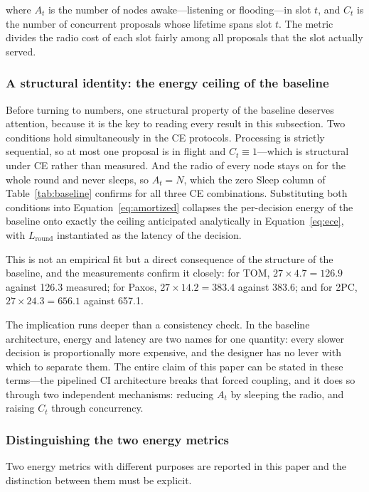 \documentclass[journal]{IEEEtran}
\newcommand{\CI}{CI}                      %
\newcommand{\CE}{CE}                      %
\newcommand{\Nnodes}{N}                   %
\newcommand{\Lround}{L_{\mathrm{round}}}  %
\begin{document}
where $A_t$ is the number of nodes awake---listening or flooding---in slot
$t$, and $C_t$ is the number of concurrent proposals whose lifetime spans
slot $t$. The metric divides the radio cost of each slot fairly among all
proposals that the slot actually served.

\subsubsection{A structural identity: the energy ceiling of the baseline}

Before turning to numbers, one structural property of the baseline
deserves attention, because it is the key to reading every result in this
subsection. Two conditions hold simultaneously in the \CE{} protocols.
Processing is strictly sequential, so at most one proposal is in flight
and $C_t \equiv 1$---which is structural under \CE{} rather than measured.
And the radio of every node stays on
for the whole round and never sleeps, so $A_t = \Nnodes$, which the zero
Sleep column of Table~\ref{tab:baseline} confirms for all three \CE{}
combinations. Substituting both conditions into
Equation~\eqref{eq:amortized} collapses the per-decision energy of the
baseline onto exactly the ceiling anticipated analytically in
Equation~\eqref{eq:ece}, with $\Lround$ instantiated as the latency of the
decision.

This is not an empirical fit but a direct consequence of the structure of
the baseline, and the measurements confirm it closely: for TOM,
$27 \times 4.7 = 126.9$ against 126.3 measured; for Paxos,
$27 \times 14.2 = 383.4$ against 383.6; and for 2PC,
$27 \times 24.3 = 656.1$ against 657.1.

The implication runs deeper than a consistency check. In the baseline
architecture, energy and latency are two names for one quantity: every
slower decision is proportionally more expensive, and the designer has no
lever with which to separate them. The entire claim of this paper can be
stated in these terms---the pipelined \CI{} architecture breaks that
forced coupling, and it does so through two independent mechanisms:
reducing $A_t$ by sleeping the radio, and raising $C_t$ through
concurrency.

\subsubsection{Distinguishing the two energy metrics}

Two energy metrics with different purposes are reported in this paper and
the distinction between them must be explicit.
\end{document}
